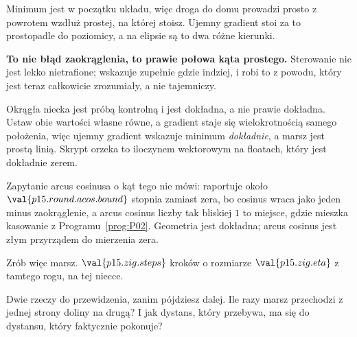 \begin{fr}
Minimum jest w początku układu, więc droga do domu prowadzi prosto z powrotem
wzdłuż prostej, na której stoisz. Ujemny gradient stoi za to prostopadle do
poziomicy, a na elipsie są to dwa różne kierunki.

\textbf{To nie błąd zaokrąglenia, to prawie połowa kąta prostego.} Sterowanie nie jest lekko nietrafione; wskazuje zupełnie gdzie
indziej, i robi to z powodu, który jest teraz całkowicie zrozumiały, a nie
tajemniczy.

\begin{note}
Okrągła niecka jest próbą kontrolną i jest dokładna, a nie prawie dokładna.
Ustaw obie wartości własne równe, a gradient staje się wielokrotnością samego
położenia, więc ujemny gradient wskazuje minimum \emph{dokładnie}, a marsz
jest prostą linią. Skrypt orzeka to iloczynem wektorowym na floatach, który
jest dokładnie zerem.

Zapytanie arcus cosinusa o kąt tego nie mówi: raportuje około
$\val{p15.round.acos.bound}$ stopnia zamiast zera, bo cosinus wraca jako jeden
minus zaokrąglenie, a arcus cosinus liczby tak bliskiej $1$ to miejsce, gdzie
mieszka kasowanie z Programu~\ref{prog:P02}. Geometria jest dokładna; arcus
cosinus jest złym przyrządem do mierzenia zera.
\end{note}
\end{fr}

\begin{fr}
Zrób więc marsz. $\val{p15.zig.steps}$ kroków o rozmiarze
$\val{p15.zig.eta}$ z tamtego rogu, na tej niecce.

Dwie rzeczy do przewidzenia, zanim pójdziesz dalej. Ile razy marsz przechodzi
z jednej strony doliny na drugą? I jak dystans, który przebywa, ma się do
dystansu, który faktycznie pokonuje?
\dotline
\nextframe
\end{fr}

